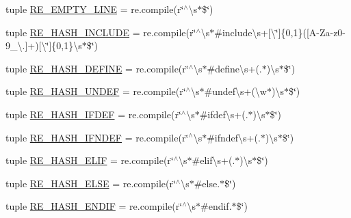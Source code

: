 \begin{DoxyCompactItemize}
tuple \hyperlink{namespacesrc_1_1regex_a4a1e54d938fbf6236d6d50135fb18f1d}{R\-E\-\_\-\-E\-M\-P\-T\-Y\-\_\-\-L\-I\-N\-E} = re.\-compile(r\char`\"{}$^\wedge$\textbackslash{}s$\ast$\$\char`\"{})
\item 
tuple \hyperlink{namespacesrc_1_1regex_ac256d6d206de3cdbdcc838d46f3dc8d8}{R\-E\-\_\-\-H\-A\-S\-H\-\_\-\-I\-N\-C\-L\-U\-D\-E} = re.\-compile(r\char`\"{}$^\wedge$\textbackslash{}s$\ast$\#include\textbackslash{}s+\mbox{[}\textbackslash{}\char`\"{}\mbox{]}\{0,1\}(\mbox{[}A-\/Za-\/z0-\/9\-\_\-\textbackslash{}.\mbox{]}+)\mbox{[}\textbackslash{}\char`\"{}\mbox{]}\{0,1\}\textbackslash{}s$\ast$\$\char`\"{})
\item 
tuple \hyperlink{namespacesrc_1_1regex_a8250e9b27e13553413c3fd8680d99348}{R\-E\-\_\-\-H\-A\-S\-H\-\_\-\-D\-E\-F\-I\-N\-E} = re.\-compile(r\char`\"{}$^\wedge$\textbackslash{}s$\ast$\#define\textbackslash{}s+(.$\ast$)\textbackslash{}s$\ast$\$\char`\"{})
\item 
tuple \hyperlink{namespacesrc_1_1regex_a0fc6ae328989750bba3349fe8c74d419}{R\-E\-\_\-\-H\-A\-S\-H\-\_\-\-U\-N\-D\-E\-F} = re.\-compile(r\char`\"{}$^\wedge$\textbackslash{}s$\ast$\#undef\textbackslash{}s+(\textbackslash{}w$\ast$)\textbackslash{}s$\ast$\$\char`\"{})
\item 
tuple \hyperlink{namespacesrc_1_1regex_a03f6feb4b0ad6bda36e1d7c0878c30fe}{R\-E\-\_\-\-H\-A\-S\-H\-\_\-\-I\-F\-D\-E\-F} = re.\-compile(r\char`\"{}$^\wedge$\textbackslash{}s$\ast$\#ifdef\textbackslash{}s+(.$\ast$)\textbackslash{}s$\ast$\$\char`\"{})
\item 
tuple \hyperlink{namespacesrc_1_1regex_aa500c35a7c6e04a69cab83aea86afccf}{R\-E\-\_\-\-H\-A\-S\-H\-\_\-\-I\-F\-N\-D\-E\-F} = re.\-compile(r\char`\"{}$^\wedge$\textbackslash{}s$\ast$\#ifndef\textbackslash{}s+(.$\ast$)\textbackslash{}s$\ast$\$\char`\"{})
\item 
tuple \hyperlink{namespacesrc_1_1regex_a4041372fdcfc96f1c54040360235f008}{R\-E\-\_\-\-H\-A\-S\-H\-\_\-\-E\-L\-I\-F} = re.\-compile(r\char`\"{}$^\wedge$\textbackslash{}s$\ast$\#elif\textbackslash{}s+(.$\ast$)\textbackslash{}s$\ast$\$\char`\"{})
\item 
tuple \hyperlink{namespacesrc_1_1regex_ada84074dfe7c76282dd9c276b132256e}{R\-E\-\_\-\-H\-A\-S\-H\-\_\-\-E\-L\-S\-E} = re.\-compile(r\char`\"{}$^\wedge$\textbackslash{}s$\ast$\#else.$\ast$\$\char`\"{})
\item 
tuple \hyperlink{namespacesrc_1_1regex_a7087d9e02abfe787381eace18029064a}{R\-E\-\_\-\-H\-A\-S\-H\-\_\-\-E\-N\-D\-I\-F} = re.\-compile(r\char`\"{}$^\wedge$\textbackslash{}s$\ast$\#endif.$\ast$\$\char`\"{})

\end{DoxyCompactItemize}
